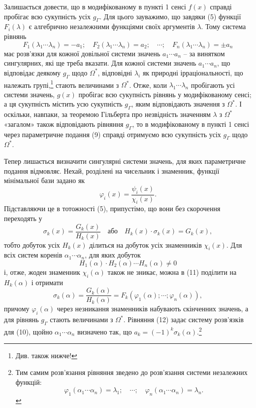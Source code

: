 \documentclass[11pt]{article}
\begin{document}
Залишається довести, що в модифікованому в пункті 1 сенсі $f(x)$ справді пробігає всю сукупність усіх $g_\Gamma$. Для цього зауважимо, що завдяки (5) функції $F_i(\lambda)$ є алгебрично незалежними функціями своїх аргументів $\lambda$. Тому система рівнянь
\begin{equation}
F_1(\lambda_1\cdots\lambda_n)=-a_1;\quad F_2(\lambda_1\cdots\lambda_n)=a_2;\quad \cdots;\quad F_n(\lambda_1\cdots\lambda_n)=\pm a_n
\tag{10}
\end{equation}
має розв'язки для кожної довільної системи значень $a_1\cdots a_n$ -- за винятком сингулярних, які ще треба вказати. Для кожної системи значень $a_1\cdots a_n$, що відповідає деякому $g_\Gamma$ щодо $\Omega^*$, відповідні $\lambda_i$ як природні ірраціональності, що належать групі,\footnote{Див. також нижче!} стають величинами з $\Omega^*$. Отже, коли $\lambda_1\cdots\lambda_n$ пробігають усі системи значень, $g(x)$ пробігає всю сукупність рівнянь у модифікованому сенсі; а ця сукупність містить усю сукупність $g_\Gamma$, яким відповідають значення з $\Omega^*$. І оскільки, навпаки, за теоремою Гільберта про незвідність значенням $\lambda$ з $\Omega^*$ «загалом» також відповідають рівняння $g_\Gamma$, то в модифікованому в пункті 1 сенсі через параметричне подання (9) справді отримуємо всю сукупність усіх $g_\Gamma$ щодо $\Omega^*$.

Тепер лишається визначити сингулярні системи значень, для яких параметричне подання відмовляє. Нехай, розділені на чисельник і знаменник, функції мінімальної бази задано як
\[
\varphi_i(x)=\frac{\psi_i(x)}{\chi_i(x)}.
\]
Підставляючи це в тотожності (5), припустімо, що вони без скорочення переходять у
\begin{equation}
\sigma_k(x)=\frac{G_k(x)}{H_k(x)}\quad\text{або}\quad H_k(x)\cdot\sigma_k(x)=G_k(x),
\tag{11}
\end{equation}
тобто добуток усіх $H_k(x)$ ділиться на добуток усіх знаменників $\chi_i(x)$. Для всіх систем коренів $\alpha_1\cdots\alpha_n$, для яких добуток
\[
H_1(\alpha)\cdot H_2(\alpha)\cdots H_n(\alpha)\neq0
\]
і, отже, жоден знаменник $\chi_i(\alpha)$ також не зникає, можна в (11) поділити на $H_k(\alpha)$ і отримати
\begin{equation}
\sigma_k(\alpha)=\frac{G_k(\alpha)}{H_k(\alpha)}=F_k(\varphi_1(\alpha);\cdots;\varphi_n(\alpha)),
\tag{12}
\end{equation}
причому $\varphi_i(\alpha)$ через незникання знаменників набувають скінченних значень, а для рівнянь $g_\Gamma$ стають величинами з $\Omega^*$. Рівняння (12) задає систему розв'язків для (10), щойно $\alpha_1\cdots\alpha_n$ визначено так, що $a_k=(-1)^k\sigma_k(\alpha)$.\footnote{Тим самим розв'язання рівняння зведено до розв'язання системи незалежних функцій:
\[
\varphi_1(\alpha_1\cdots\alpha_n)=\lambda_1;\quad \cdots;\quad \varphi_n(\alpha_1\cdots\alpha_n)=\lambda_n.
\]}
\end{document}
